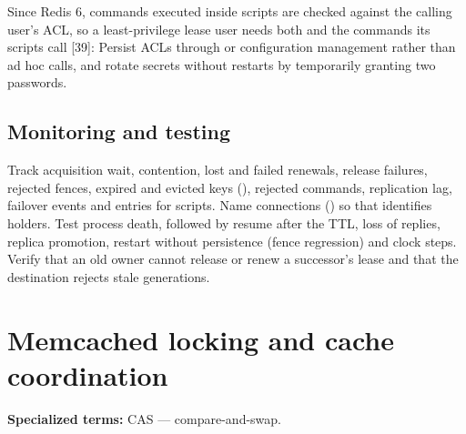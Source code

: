 Since Redis 6, commands executed inside scripts are checked against the calling user's ACL, so a least-privilege lease user needs both  and the commands its scripts call [39]:
Persist ACLs through  or configuration management rather than ad hoc  calls, and rotate secrets without restarts by temporarily granting two passwords.

\section{Monitoring and testing}
Track acquisition wait, contention, lost and failed renewals, release failures, rejected fences, expired and evicted keys (), rejected commands, replication lag, failover events and  entries for scripts. Name connections () so that  identifies holders. Test process death,  followed by resume after the TTL, loss of replies, replica promotion, restart without persistence (fence regression) and clock steps. Verify that an old owner cannot release or renew a successor's lease and that the destination rejects stale generations.



\chapter{Memcached locking and cache coordination}
\par\smallskip\noindent\textbf{Specialized terms:} CAS --- compare-and-swap.\par\smallskip

